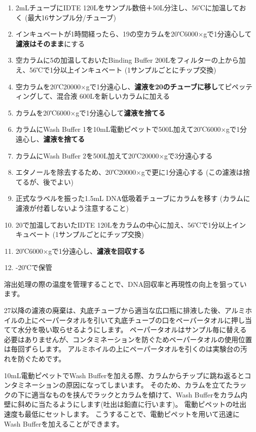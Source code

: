 \documentclass[titlepage,10pt,a4paper,uplatex]{jsbook}
\renewcommand{\textbf}[1]{{\bfseries\sffamily#1}}
\begin{document}
\begin{enumerate}
\item 2mLチューブにIDTE 120{\textmu}Lをサンプル数倍＋50{\textmu}L分注し、56℃に加温しておく (最大16サンプル分/チューブ)
\item インキュベートが1時間経ったら、19の空カラムを20℃6000×gで1分遠心して\textbf{濾液はそのまま}にする
\item 空カラムに5の加温しておいたBinding Buffer 200{\textmu}Lをフィルターの上から加え、56℃で1分以上インキュベート (1サンプルごとにチップ交換)
\item 空カラムを20℃20000×gで1分遠心し、\textbf{濾液を20のチューブに移し}てピペッティングして、混合液 600{\textmu}Lを新しいカラムに加える
\item カラムを20℃6000×gで1分遠心して\textbf{濾液を捨てる}
\item カラムにWash Buffer 1を10mL電動ピペットで500{\textmu}L加えて20℃6000×gで1分遠心し、\textbf{濾液を捨てる}
\item カラムにWash Buffer 2を500{\textmu}L加えて20℃20000×gで3分遠心する
\item エタノールを除去するため、20℃20000×gで更に1分遠心する (この濾液は捨てるが、後でよい)
\item 正式なラベルを振った1.5mL DNA低吸着チューブにカラムを移す (カラムに濾液が付着しないよう注意すること)
\item 20で加温しておいたIDTE 120{\textmu}Lをカラムの中心に加え、56℃で1分以上インキュベート (1サンプルごとにチップ交換)
\item 20℃6000×gで1分遠心し、\textbf{濾液を回収する}
\item -20℃で保管
\end{enumerate}

溶出処理の際の温度を管理することで、DNA回収率と再現性の向上を狙っています。

27以降の濾液の廃棄は、丸底チューブから適当な広口瓶に排液した後、アルミホイルの上にペーパータオルを引いて丸底チューブの口をペーパータオルに押し当てて水分を吸い取らせるようにします。
ペーパータオルはサンプル毎に替える必要はありませんが、コンタミネーションを防ぐためペーパータオルの使用位置は毎回ずらします。
アルミホイルの上にペーパータオルを引くのは実験台の汚れを防ぐためです。

10mL電動ピペットでWash Bufferを加える際、カラムからチップに跳ね返るとコンタミネーションの原因になってしまいます。
そのため、カラムを立てたラックの下に適当なものを挟んでラックとカラムを傾けて、Wash Bufferをカラム内壁に斜めに当たるようにします(吐出は鉛直に行います)。
電動ピペットの吐出速度も最低にセットします。
こうすることで、電動ピペットを用いて迅速にWash Bufferを加えることができます。
\end{document}
